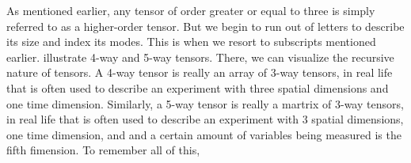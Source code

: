     As mentioned earlier, any tensor of order greater or equal to three is
    simply referred to as a higher-order tensor. But we begin to run out of
    letters to describe its size and index its modes. This is when we resort
    to subscripts mentioned earlier.  illustrate
    4-way and 5-way tensors. There, we can visualize the recursive nature of
    tensors. A 4-way tensor is really an array of 3-way tensors, in real
    life that is often used to describe an experiment with three spatial
    dimensions and one time dimension. Similarly, a 5-way tensor is really a
    martrix of 3-way tensors, in real life that is often used to describe an
    experiment with 3 spatial dimensions, one time dimension, and and a
    certain amount of variables being measured is the fifth fimension. To
    remember all of this, 

    \newcommand{\drawcube}[1]{
        \def\ix{2} %
        \def\iy{2} %
        \def\iz{1.5} %
        \def\corescale{1}
        \def\rot{90}
        \def\r{0.25} %
        \def\rx{\ix/\corescale}
        \def\ry{\iy/\corescale}
        \def\rz{\iz/\corescale}

        \begin{tikzpicture}[scale=#1, every node/.style={inner sep=0pt}] %
            \coordinate (TFrontLowerLeft) at (0,0);
            \draw (TFrontLowerLeft) rectangle ++ (\rx,\ry); %

            \begin{scope}[shift={(TFrontLowerLeft)}, canvas is zx plane at y=\ry,rotate=\rot]
            \draw (0,0) rectangle ++ (\rx,\rz);
            \end{scope}

            \begin{scope}[shift={(TFrontLowerLeft)},canvas is zy plane at x=\rx,rotate=\rot]
            \draw (0,0) rectangle ++ (\ry,\rz);
            \end{scope}
        \end{tikzpicture}
    }

